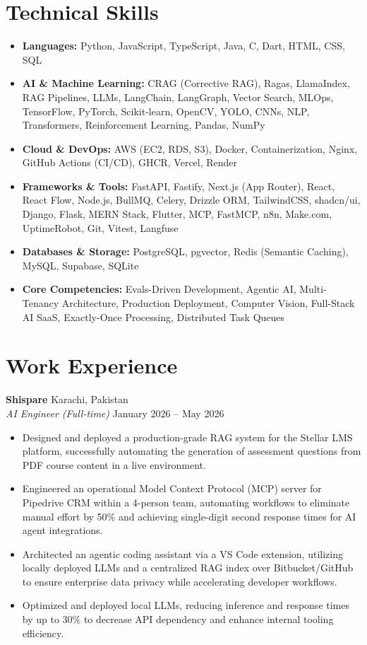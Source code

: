 \documentclass[11pt, a4paper]{article}
\begin{document}
\section*{Technical Skills}
\begin{itemize}[leftmargin=0.15in, label={}]
    \item \textbf{Languages:} Python, JavaScript, TypeScript, Java, C, Dart, HTML, CSS, SQL
    \item \textbf{AI \& Machine Learning:} CRAG (Corrective RAG), Ragas, LlamaIndex, RAG Pipelines, LLMs, LangChain, LangGraph, Vector Search, MLOps, TensorFlow, PyTorch, Scikit-learn, OpenCV, YOLO, CNNs, NLP, Transformers, Reinforcement Learning, Pandas, NumPy
    \item \textbf{Cloud \& DevOps:} AWS (EC2, RDS, S3), Docker, Containerization, Nginx, GitHub Actions (CI/CD), GHCR, Vercel, Render
    \item \textbf{Frameworks \& Tools:} FastAPI, Fastify, Next.js (App Router), React, React Flow, Node.js, BullMQ, Celery, Drizzle ORM, TailwindCSS, shadcn/ui, Django, Flask, MERN Stack, Flutter, MCP, FastMCP, n8n, Make.com, UptimeRobot, Git, Vitest, Langfuse
    \item \textbf{Databases \& Storage:} PostgreSQL, pgvector, Redis (Semantic Caching), MySQL, Supabase, SQLite
    \item \textbf{Core Competencies:} Evals-Driven Development, Agentic AI, Multi-Tenancy Architecture, Production Deployment, Computer Vision, Full-Stack AI SaaS, Exactly-Once Processing, Distributed Task Queues
\end{itemize}

\section*{Work Experience}

\textbf{Shispare} \hfill Karachi, Pakistan \\
\textit{AI Engineer (Full-time)} \hfill January 2026 -- May 2026
\begin{itemize}[leftmargin=0.25in, itemsep=2pt]
    \item Designed and deployed a production-grade RAG system for the Stellar LMS platform, successfully automating the generation of assessment questions from PDF course content in a live environment.
    \item Engineered an operational Model Context Protocol (MCP) server for Pipedrive CRM within a 4-person team, automating workflows to eliminate manual effort by 50\% and achieving single-digit second response times for AI agent integrations.
    \item Architected an agentic coding assistant via a VS Code extension, utilizing locally deployed LLMs and a centralized RAG index over Bitbucket/GitHub to ensure enterprise data privacy while accelerating developer workflows.
    \item Optimized and deployed local LLMs, reducing inference and response times by up to 30\% to decrease API dependency and enhance internal tooling efficiency.
\end{itemize}
\end{document}
